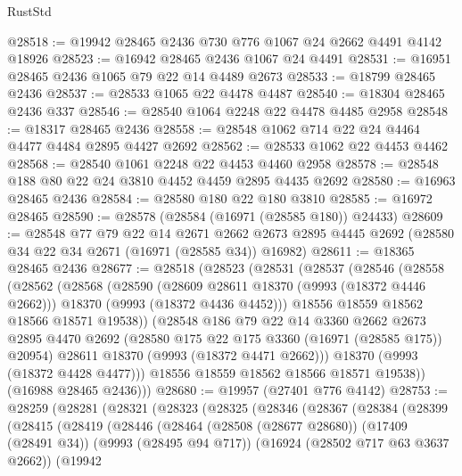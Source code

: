 \begin{lexlean}{RustStd}
\begin{coremodule}
@28518 := @19942 @28465 @2436 @730 @776 @1067 @24 @2662 @4491 @4142 @18926
@28523 := @16942 @28465 @2436 @1067 @24 @4491
@28531 := @16951 @28465 @2436 @1065 @79 @22 @14 @4489 @2673
@28533 := @18799 @28465 @2436
@28537 := @28533 @1065 @22 @4478 @4487
@28540 := @18304 @28465 @2436 @337
@28546 := @28540 @1064 @2248 @22 @4478 @4485 @2958
@28548 := @18317 @28465 @2436
@28558 := @28548 @1062 @714 @22 @24 @4464 @4477 @4484 @2895 @4427 @2692
@28562 := @28533 @1062 @22 @4453 @4462
@28568 := @28540 @1061 @2248 @22 @4453 @4460 @2958
@28578 := @28548 @188 @80 @22 @24 @3810 @4452 @4459 @2895 @4435 @2692
@28580 := @16963 @28465 @2436
@28584 := @28580 @180 @22 @180 @3810
@28585 := @16972 @28465
@28590 := @28578 (@28584 (@16971 (@28585 @180)) @24433)
@28609 := @28548
    @77
    @79
    @22
    @14
    @2671
    @2662
    @2673
    @2895
    @4445
    @2692
    (@28580 @34 @22 @34 @2671 (@16971 (@28585 @34)) @16982)
@28611 := @18365 @28465 @2436
@28677 := @28518
    (@28523
      (@28531
        (@28537
          (@28546
            (@28558
              (@28562
                (@28568
                  (@28590
                    (@28609 @28611 @18370 (@9993 (@18372 @4446 @2662)))
                    @18370
                    (@9993 (@18372 @4436 @4452)))
                  @18556
                  @18559
                  @18562
                  @18566
                  @18571
                  @19538))
              (@28548
                @186
                @79
                @22
                @14
                @3360
                @2662
                @2673
                @2895
                @4470
                @2692
                (@28580 @175 @22 @175 @3360 (@16971 (@28585 @175)) @20954)
                @28611
                @18370
                (@9993 (@18372 @4471 @2662)))
              @18370
              (@9993 (@18372 @4428 @4477)))
            @18556
            @18559
            @18562
            @18566
            @18571
            @19538))
        (@16988 @28465 @2436)))
@28680 := @19957 (@27401 @776 @4142)
@28753 := @28259
    (@28281
      (@28321
        (@28323
          (@28325
            (@28346
              (@28367
                (@28384
                  (@28399
                    (@28415
                      (@28419
                        (@28446
                          (@28464
                            (@28508 (@28677 @28680))
                            (@17409 (@28491 @34))
                            (@9993 (@28495 @94 @717))
                            (@16924 (@28502 @717 @63 @3637 @2662))
                            (@19942

\end{coremodule}
\end{lexlean}
